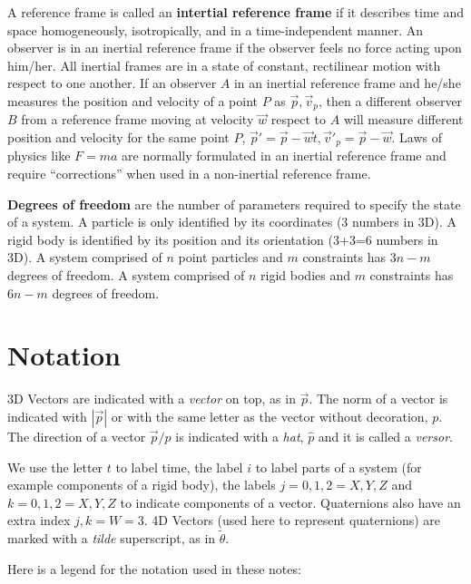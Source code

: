 \documentclass[12pt]{article}
\begin{document}
A reference frame is called an {\bf intertial reference frame} if it describes time and space homogeneously, isotropically, and in a time-independent manner. An observer is in an inertial reference frame if the observer feels no force acting upon him/her. All inertial frames are in a state of constant, rectilinear motion with respect to one another.
If an observer $A$ in an inertial reference frame and he/she measures the position and velocity of a point $P$ as $\vec p,\vec v_p$, then a different observer $B$ from a reference frame moving at velocity $\vec w$ respect to $A$ will measure different position and velocity for the same point $P$, $\vec p' = \vec p-\vec w t,\vec v'_p = \vec p-\vec w$. Laws of physics like $F=ma$ are normally formulated in an inertial reference frame and require ``corrections'' when used in a non-inertial reference frame.

{\bf Degrees of freedom} are the number of parameters required to specify the state of a system. A particle is only identified by its coordinates (3 numbers in 3D). A rigid body is identified by its position and its orientation (3+3=6 numbers in 3D). A system comprised of $n$ point particles and $m$ constraints has $3n-m$ degrees of freedom. A system comprised of $n$ rigid bodies and $m$ constraints has $6n-m$ degrees of freedom.

\section{Notation}

3D Vectors are indicated with a {\it vector} on top, as in $\vec p$. The norm of a vector is indicated with $|\vec p|$ or with the same letter as the vector without decoration, $p$. The direction of a vector $\vec p/p$ is indicated with a {\it hat}, $\hat p$ and it is called a {\it versor}.

We use the letter $t$ to label time, the label $i$ to label parts of a system (for example components of a rigid body), the labels $j=0,1,2=X,Y,Z$ and $k=0,1,2=X,Y,Z$ to indicate components of a vector. Quaternions also have an extra index $j,k=W=3$. 4D Vectors (used here to represent quaternions) are marked with a {\it tilde} superscript, as in $\tilde \theta$.

Here is a legend for the notation used in these notes:
\end{document}
